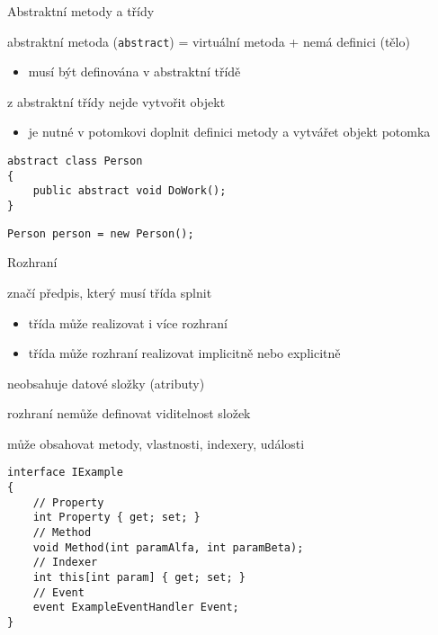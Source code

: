 \begin{frame}[fragile]
\begin{bitemize}{Abstraktní metody a třídy}
\item abstraktní metoda (\lstinline|abstract|) = virtuální metoda + nemá definici (tělo)
\begin{itemize}
\item musí být definována v abstraktní třídě
\end{itemize}
\item z abstraktní třídy nejde vytvořit objekt
\begin{itemize}
\item je nutné v potomkovi doplnit definici metody a vytvářet objekt potomka
\end{itemize}
\end{bitemize}
\vfill
\begin{yesblock}
\begin{lstlisting}[basicstyle=\small]
abstract class Person
{
    public abstract void DoWork();
}
\end{lstlisting}
\end{yesblock}
\vfill
\begin{noblock}
\begin{lstlisting}[basicstyle=\small]
Person person = new Person();
\end{lstlisting}
\end{noblock}
\end{frame}






\begin{frame}[fragile]
\begin{bitemize}{Rozhraní}
\item značí předpis, který musí třída splnit
\begin{itemize}
\item třída může realizovat i více rozhraní
\item třída může rozhraní realizovat implicitně nebo explicitně
\end{itemize}
\item neobsahuje datové složky (atributy)
\item rozhraní nemůže definovat viditelnost složek
\item může obsahovat metody, vlastnosti, indexery, události
\end{bitemize}
\vfill
\begin{yesblock}
\begin{lstlisting}[basicstyle=\small]
interface IExample
{
    // Property
    int Property { get; set; }
    // Method
    void Method(int paramAlfa, int paramBeta);
    // Indexer
    int this[int param] { get; set; }
    // Event
    event ExampleEventHandler Event;
}
\end{lstlisting}
\end{yesblock}
\end{frame}




